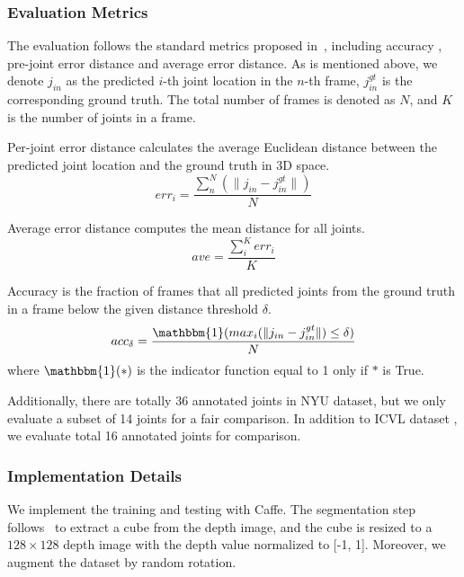 \documentclass[journal,comsoc]{IEEEtran}
\begin{document}
\subsubsection{Evaluation Metrics}\label{sec:evaluation metrics}
The evaluation follows the standard metrics proposed in~\cite{oberweger2015hands}, including accuracy 
, pre-joint error distance and average error distance. As is mentioned above, we denote $j_{in}$ as 
the predicted $i$-th joint location in the $n$-th frame, $j_{in}^{gt}$ is the corresponding ground 
truth. The total number of frames is denoted as $N$, and $K$ is the number of joints in a frame. 

Per-joint error distance calculates the average Euclidean distance between the predicted 
joint location and the ground truth in 3D space.
\begin{equation}
err_i = \frac{\sum_n^N(\|j_{in} - j_{in}^{gt} \|)}{N}
\end{equation}

Average error distance computes the mean distance for all joints.
\begin{equation}
ave = \frac{\sum_i^K{err_i}}{K}
\end{equation}

Accuracy is the fraction of frames that all predicted joints from the ground truth in a 
frame below the given distance threshold $\delta$.
\begin{equation}
acc_{\delta} = \frac{\mathbbm{1}(max_i(\| j_{in} - j_{in}^{gt}\|) \leq \delta)}{N}
\end{equation}
where $\mathbbm{1}(*)$ is the indicator function equal to 1 only if $*$ is True.

Additionally, there are totally 36 annotated joints in NYU dataset, but we only
evaluate a subset of 14 joints for a fair comparison. In addition to ICVL dataset
, we evaluate total 16 annotated joints for comparison.

\subsubsection{Implementation Details}\label{sec:implementation}
We implement the training and testing with Caffe\cite{jia2014caffe}. The segmentation step
follows~\cite{oberweger2015hands} to extract a cube from the depth image, and the cube is
resized to a $128 \times 128$ depth image with the depth value normalized to [-1, 1]. Moreover, we
augment the dataset by random rotation.
\end{document}
